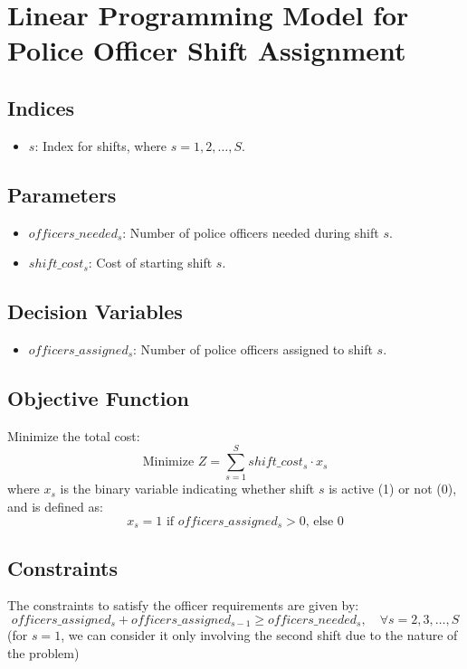 \documentclass{article}
\begin{document}
\section*{Linear Programming Model for Police Officer Shift Assignment}

\subsection*{Indices}
\begin{itemize}
    \item $s$: Index for shifts, where $s = 1, 2, \ldots, S$.
\end{itemize}

\subsection*{Parameters}
\begin{itemize}
    \item $officers\_needed_{s}$: Number of police officers needed during shift $s$.
    \item $shift\_cost_{s}$: Cost of starting shift $s$.
\end{itemize}

\subsection*{Decision Variables}
\begin{itemize}
    \item $officers\_assigned_{s}$: Number of police officers assigned to shift $s$.
\end{itemize}

\subsection*{Objective Function}
Minimize the total cost:
\[
\text{Minimize } Z = \sum_{s=1}^{S} shift\_cost_{s} \cdot x_s
\]
where \( x_s \) is the binary variable indicating whether shift \( s \) is active (1) or not (0), and is defined as:
\[
x_s = 1 \text{ if } officers\_assigned_{s} > 0 \text{, else } 0
\]

\subsection*{Constraints}
The constraints to satisfy the officer requirements are given by:
\[
officers\_assigned_{s} + officers\_assigned_{s-1} \geq officers\_needed_{s}, \quad \forall s = 2, 3, \ldots, S
\]
(for $s = 1$, we can consider it only involving the second shift due to the nature of the problem)
\end{document}
